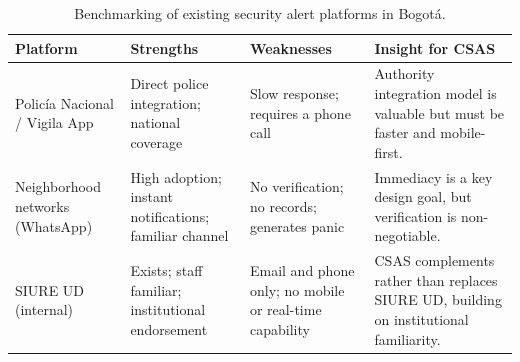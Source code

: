 \documentclass[12pt, oneside]{article}
\begin{document}
\begin{table}[H]
\caption{Benchmarking of existing security alert platforms in Bogot\'a.}
\label{tab:bench}
\renewcommand{\arraystretch}{1.2}
\centering
\begin{tabular}{L{2.4cm} L{2.8cm} L{2.8cm} L{4.5cm}}
\toprule
\textbf{Platform} & \textbf{Strengths} & \textbf{Weaknesses} & \textbf{Insight for CSAS} \\
\midrule
Polic\'ia Nacional / Vigila App
& Direct police integration; national coverage
& Slow response; requires a phone call
& Authority integration model is valuable but must be faster and mobile-first. \\
\addlinespace
Neighborhood networks (WhatsApp)
& High adoption; instant notifications; familiar channel
& No verification; no records; generates panic
& Immediacy is a key design goal, but verification is non-negotiable. \\
\addlinespace
SIURE UD (internal)
& Exists; staff familiar; institutional endorsement
& Email and phone only; no mobile or real-time capability
& CSAS complements rather than replaces SIURE UD, building on institutional familiarity. \\
\bottomrule
\end{tabular}
\end{table}
\end{document}
